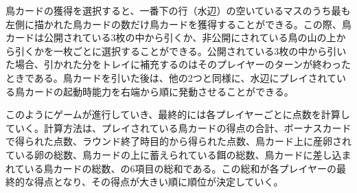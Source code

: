 \begin{multicols}{2}
\par
鳥カードの獲得を選択すると、一番下の行（水辺）の空いているマスのうち最も左側に描かれた鳥カードの数だけ鳥カードを獲得することができる。この際、鳥カードは公開されている3枚の中から引くか、非公開にされている鳥の山の上から引くかを一枚ごとに選択することができる。公開されている3枚の中から引いた場合、引かれた分をトレイに補充するのはそのプレイヤーのターンが終わったときである。鳥カードを引いた後は、他の2つと同様に、水辺にプレイされている鳥カードの起動時能力を右端から順に発動させることができる。
\par
このようにゲームが進行していき、最終的には各プレイヤーごとに点数を計算していく。計算方法は、プレイされている鳥カードの得点の合計、ボーナスカードで得られた点数、ラウンド終了時目的から得られた点数、鳥カード上に産卵されている卵の総数、鳥カードの上に蓄えられている餌の総数、鳥カードに差し込まれている鳥カードの総数、の6項目の総和である。この総和が各プレイヤーの最終的な得点となり、その得点が大きい順に順位が決定していく。

\end{multicols}
